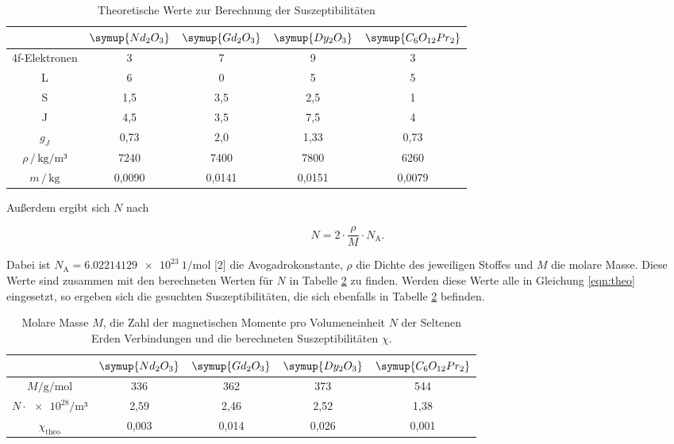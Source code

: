 \begin{table}
\centering
\caption{Theoretische Werte zur Berechnung der Suszeptibilitäten}
\label{tab:theo}
\begin{tabular}{c c c c c}
\toprule
& $\symup{Nd_2O_3}$ & $\symup{Gd_2O_3}$ & $\symup{Dy_2O_3}$ & $\symup{C_6O_{12}Pr_2}$\\
\midrule
4f-Elektronen                             & 3      & 7      & 9      & 3\\
L                                         & 6      & 0      & 5      & 5\\
S                                         & 1,5    & 3,5    & 2,5    & 1\\
J                                         & 4,5    & 3,5    & 7,5    & 4\\
$g_J$                                     & 0,73   & 2,0    & 1,33   & 0,73\\
$\rho \, / \, \si{\kilo\gram\per\meter³}$ & 7240   & 7400   & 7800   & 6260\\
$m \, / \, \si{\kilo\gram}$               & 0,0090 & 0,0141 & 0,0151 & 0,0079\\
\bottomrule
\end{tabular}
\end{table}


Außerdem ergibt sich $N$ nach

\begin{equation*}
N = 2 \cdot \frac{\rho}{M}\cdot N_\text{A}.
\end{equation*}

Dabei ist $N_\text{A} = \SI{6.02214129e23}{1\per\mol}$ [2] die 
Avogadrokonstante, $\rho$ die Dichte des jeweiligen Stoffes und $M$
die molare Masse. Diese Werte sind zusammen mit den berechneten Werten für $N$
in Tabelle \ref{tab:theo2} zu finden. Werden diese Werte alle in Gleichung  
\eqref{eqn:theo} eingesetzt, so ergeben sich die gesuchten Suszeptibilitäten, die sich ebenfalls in 
Tabelle \ref{tab:theo2} befinden. 

\begin{table}
\centering
\caption{Molare Masse $M$, die Zahl der magnetischen Momente
pro Volumeneinheit $N$ der Seltenen Erden Verbindungen und die berechneten 
Suszeptibilitäten $\chi$.}
\label{tab:theo2}
\begin{tabular}{c c c c c}
\toprule
& $\symup{Nd_2O_3}$ & $\symup{Gd_2O_3}$ & $\symup{Dy_2O_3}$ & $\symup{C_6O_{12}Pr_2}$\\
\midrule
$M/\si{\gram\per\mol}$           & 336   & 362   & 373   & 544\\
$N \cdot \num{e28}/\si{\meter³}$ & 2,59  & 2,46  & 2,52  & 1,38\\
$\chi_\text{theo}$               & 0,003 & 0,014 & 0,026 & 0,001\\
\bottomrule
\end{tabular}
\end{table}


